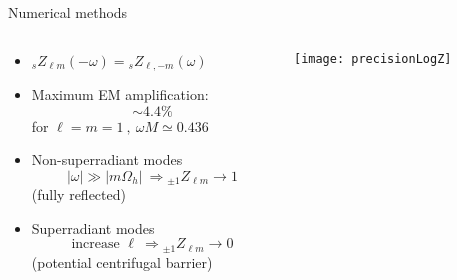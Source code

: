 \documentclass[9pt]{beamer}
\newcommand{\uu}[3][]{ {}_{#1} #2_{#3} }
\begin{document}
\begin{frame}{Numerical methods}
	\begin{columns}
		\begin{column}{0.45\textwidth}
			\begin{itemize}
				\setlength\itemsep{1.5em}
				\item $\uu[s]{Z}{\ell m}(-\omega) = \uu[s]{Z}{\ell, -m}(\omega)$

				\item Maximum EM amplification:
				$$\sim \mathbf{4.4\%}$$
				for $\ell=m=1 ~,~  \omega M \simeq 0.436$

				\item Non-superradiant modes $$|\omega|\gg|m\Omega_h| ~\Rightarrow {}_{\pm 1}{Z}_{\ell m} \to 1 $$ (fully reflected)

				\item Superradiant modes
				$$ \text{increase } \ell ~\Rightarrow {}_{\pm 1}{Z}_{\ell m} \to 0 $$
				(potential centrifugal barrier)
			\end{itemize}
		\end{column}
		\begin{column}{0.55\textwidth}
			\texttt{[image: precisionLogZ]}
		\end{column}
	\end{columns}
\end{frame}
\end{document}
